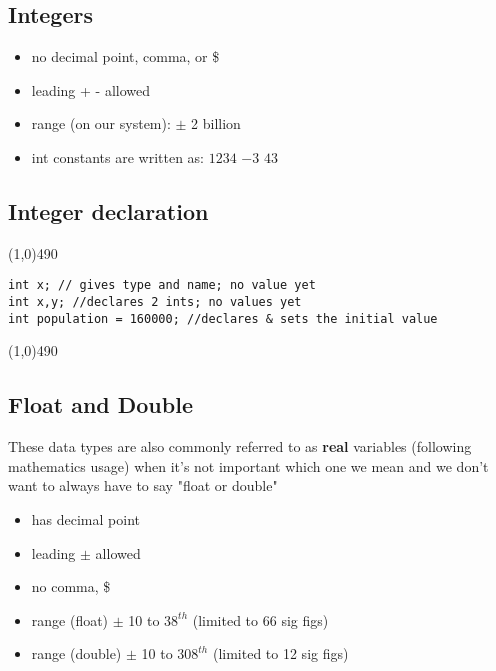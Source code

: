 \documentclass{report}
\begin{document}
        \bigbreak \noindent \bigbreak \noindent 
        \subsection{Integers}
        \bigbreak \noindent 
        \begin{itemize}
            \item no decimal point, comma, or \$ 
            \item leading + - allowed
            \item range (on our system): $\pm$ 2 billion
            \item int constants are written as: $1234$ $-3$ $43$
        \end{itemize}

        \bigbreak \noindent 
        \subsection{Integer declaration}
        \bigbreak \noindent 
\line(1,0){490}
        \begin{verbatim}
int x; // gives type and name; no value yet
int x,y; //declares 2 ints; no values yet
int population = 160000; //declares & sets the initial value
        \end{verbatim}
\line(1,0){490}
        
        \bigbreak \noindent \bigbreak \noindent 
        \bigbreak \noindent 

        \bigbreak \noindent \bigbreak \noindent 
        \subsection{Float and Double}
        \bigbreak \noindent 
        These data types are also commonly referred to as \textbf{real} variables  (following mathematics usage) when it's not important which one we mean and we don't want to always have to say "float or double"
        \begin{itemize}
            \item has decimal point
            \item leading $\pm$ allowed
            \item no comma, \$
            \item range (float) $\pm$ 10 to $38^{th}$ (limited to 66 sig figs)
            \item range (double) $\pm$ 10 to $308^{th}$ (limited to 12 sig figs)
        \end{itemize}
        
\end{document}
